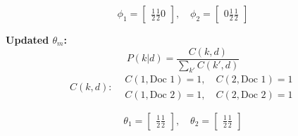 \documentclass{article}
\begin{document}
\begin{enumerate}
	\[
	\phi_1 =
	\begin{bmatrix}
	\frac{1}{2} %
	\frac{1}{2} %
	0            %
	\end{bmatrix}, \quad
	\phi_2 =
	\begin{bmatrix}
	0             %
	\frac{1}{2}  %
	\frac{1}{2}  %
	\end{bmatrix}
	\]
	
	\textbf{Updated \( \theta_m \):}
	\[
	P(k|d) = \frac{C(k, d)}{\sum_{k'} C(k', d)}
	\]
	\[
	C(k, d):
	\begin{aligned}
	    &C(1, \text{Doc 1}) = 1, \quad C(2, \text{Doc 1}) = 1 \\
	    &C(1, \text{Doc 2}) = 1, \quad C(2, \text{Doc 2}) = 1
	\end{aligned}
	\]
	
	\[
	\theta_1 =
	\begin{bmatrix}
	\frac{1}{2}  %
	\frac{1}{2}  %
	\end{bmatrix}, \quad
	\theta_2 =
	\begin{bmatrix}
	\frac{1}{2}  %
	\frac{1}{2}  %
	\end{bmatrix}
	\]

\end{enumerate}
\end{document}
